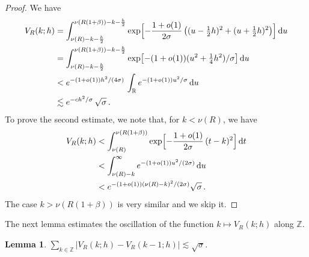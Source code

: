 \documentclass[10pt,a4paper]{amsart}
\newtheorem{lemma}{Lemma}
\newcommand{\bZ}{\mathbb Z}
\newcommand{\bR}{\mathbb R}
\begin{document}
\begin{proof}
We have
\begin{align*}
V_R(k; h) &=
\int_{\nu (R)-k-\frac{h}2}^{\nu(R(1+\beta))-k-\frac{h}2}
\exp\Bigl[ -\frac{1+o(1)}{2\sigma}\,
\bigl( (u-\tfrac12 h)^2 + (u+\tfrac12 h)^2 \bigr)
\Bigr]\, {\rm d}u \\
&=
\int_{\nu (R)-k-\frac{h}2}^{\nu(R(1+\beta))-k-\frac{h}2}
\exp\bigl[ -(1+o(1))(u^2 + \tfrac14 h^2)/\sigma \bigr]\, {\rm d}u \\
&<
e^{-(1+o(1))h^2/(4\sigma)}\,
\int_{\bR} e^{-(1+o(1))u^2/\sigma}\, {\rm d}u \\
&\lesssim e^{-ch^2/\sigma}\, \sqrt{\sigma}\,.
\end{align*}
To prove the second estimate, we note that, for $k<\nu(R)$, we have
\begin{align*}
V_R(k; h) &<
\int_{\nu(R)}^{\nu(R(1+\beta))}
\exp\Bigl[ -\frac{1+o(1)}{2\sigma}\, (t-k)^2 \Bigr]\, {\rm d}t \\
&<
\int_{\nu(R)-k}^\infty e^{-(1+o(1))u^2/(2\sigma)}\, {\rm d}u \\
&< e^{-(1+o(1))(\nu(R)-k)^2/(2\sigma)}\sqrt{\sigma}\,.
\end{align*}
The case $k>\nu(R(1+\beta))$ is very similar and we skip it.
\end{proof}

The next lemma estimates the oscillation of the function $k\mapsto V_R(k; h)$ along $\mathbb Z$.

\begin{lemma}\label{Lemma5D}
$ \displaystyle \sum_{k\in\bZ}
|V_R(k; h) - V_R(k-1; h)| \lesssim \sqrt{\sigma} $.
\end{lemma}
\end{document}
